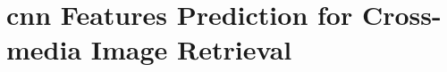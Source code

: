 
\graphicspath{{img/t2v/}}

\def\xt{\mathbf{\tilde{x}}} %
\def\t{\mathbf{t}} %
\def\s{\mathbf{s}} %
\def\e{\mathbf{e}} %
\def\E{\mathbf{E}} %

\newcommand{\ttv}{\textsc{Text2Vis}}
\newcommand{\sparsettv}{\textsc{S-Text2Vis}}
\newcommand{\densettv}{\textsc{D-Text2Vis}}
\newcommand{\widedeepttv}{\textsc{W\&D-Text2Vis}}
\newcommand{\visreg}{\textsc{VisReg}}
\newcommand{\wordvisual}{\textsc{Word2VisualVec}}
\newcommand{\resnet}{\gls{resnet}-152}

\chapter{\gls{cnn} Features Prediction for Cross-media Image Retrieval}
\label{ch:text2vis}


